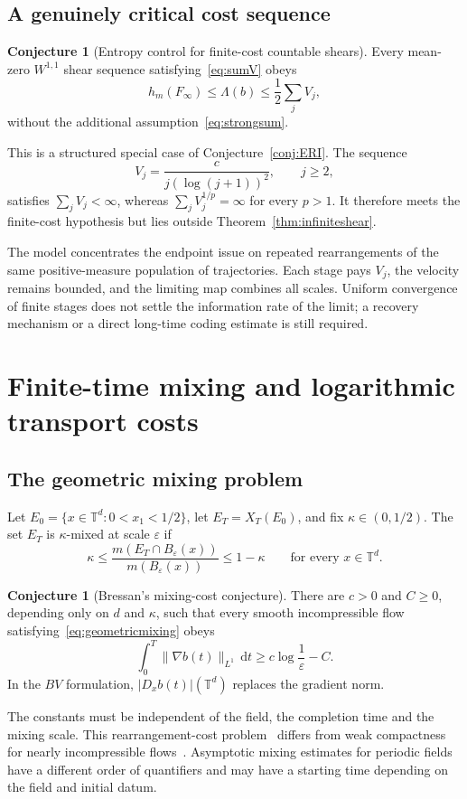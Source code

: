 \documentclass[review,12pt,times,a4paper,nopreprintline]{elsarticle}
\theoremstyle{plain}
\theoremstyle{definition}
\newtheorem{conjecture}[theorem]{Conjecture}
\theoremstyle{remark}
\newcommand{\T}{\mathbb T}
\newcommand{\dd}{\,\mathrm d}
\numberwithin{equation}{section}
\begin{document}
\subsection{A genuinely critical cost sequence}
\begin{conjecture}[Entropy control for finite-cost countable shears]\label{conj:shear}
Every mean-zero $W^{1,1}$ shear sequence satisfying~\eqref{eq:sumV} obeys
\[
 h_m(F_\infty)\leq\Lambda(b)\leq\frac12\sum_jV_j,
\]
without the additional assumption~\eqref{eq:strongsum}.
\end{conjecture}
This is a structured special case of Conjecture~\ref{conj:ERI}. The sequence
\begin{equation}\label{eq:criticalsequence}
 V_j=\frac{c}{j(\log(j+1))^2},\qquad j\geq2,
\end{equation}
satisfies $\sum_jV_j<\infty$, whereas $\sum_jV_j^{1/p}=\infty$ for every $p>1$. It therefore meets the finite-cost hypothesis but lies outside Theorem~\ref{thm:infiniteshear}.

The model concentrates the endpoint issue on repeated rearrangements of the same positive-measure population of trajectories. Each stage pays $V_j$, the velocity remains bounded, and the limiting map combines all scales. Uniform convergence of finite stages does not settle the information rate of the limit; a recovery mechanism or a direct long-time coding estimate is still required.

\section{Finite-time mixing and logarithmic transport costs}\label{sec:mixing}
\subsection{The geometric mixing problem}
Let $E_0=\{x\in\T^d:0<x_1<1/2\}$, let $E_T=X_T(E_0)$, and fix $\kappa\in(0,1/2)$. The set $E_T$ is $\kappa$-mixed at scale $\varepsilon$ if
\begin{equation}\label{eq:geometricmixing}
 \kappa\leq\frac{m(E_T\cap B_\varepsilon(x))}{m(B_\varepsilon(x))}
 \leq1-\kappa\qquad\text{for every }x\in\T^d.
\end{equation}

\begin{conjecture}[Bressan's mixing-cost conjecture]\label{conj:Bressan}
There are $c>0$ and $C\geq0$, depending only on $d$ and $\kappa$, such that every smooth incompressible flow satisfying~\eqref{eq:geometricmixing} obeys
\begin{equation}\label{eq:bressan}
 \int_0^T\|\nabla b(t)\|_{L^1}\dd t
 \geq c\log\frac1\varepsilon-C.
\end{equation}
In the $BV$ formulation, $|D_xb(t)|(\T^d)$ replaces the gradient norm.
\end{conjecture}
The constants must be independent of the field, the completion time and the mixing scale. This rearrangement-cost problem~\cite{Bressan} differs from weak compactness for nearly incompressible flows~\cite{BianchiniBonicatto}. Asymptotic mixing estimates for periodic fields~\cite{BCJ} have a different order of quantifiers and may have a starting time depending on the field and initial datum.
\end{document}
